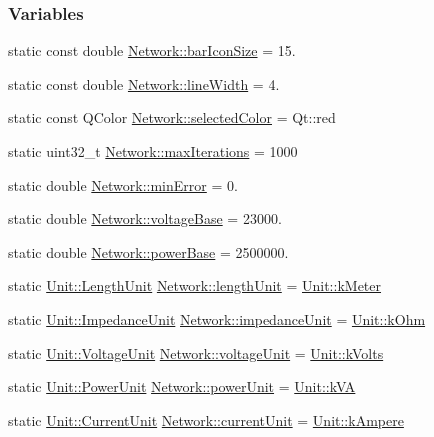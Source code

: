 \subsubsection*{Variables}
\begin{DoxyCompactItemize}
\item 
static const double \hyperlink{group___graphics_gaa334bbc93b3fde219840e95e23198b53}{Network\+::bar\+Icon\+Size} = 15.
\item 
static const double \hyperlink{group___graphics_ga3f810634c9908d62d33a1ab09a76c147}{Network\+::line\+Width} = 4.
\item 
static const Q\+Color \hyperlink{group___graphics_gaa9e21b8e2a24b0495e776a51e1aeed94}{Network\+::selected\+Color} = Qt\+::red
\item 
static uint32\+\_\+t \hyperlink{group___graphics_ga318dee060bc577eacd67d332efbbe1b2}{Network\+::max\+Iterations} = 1000
\item 
static double \hyperlink{group___graphics_gabcdc973129d3dda7572b7a1c388da1b5}{Network\+::min\+Error} = 0.
\item 
static double \hyperlink{group___graphics_ga7c1e79d9ac69df9a69f24eaf092fd5e5}{Network\+::voltage\+Base} = 23000.
\item 
static double \hyperlink{group___graphics_ga74bb7aa495d422f1f092acdf958df989}{Network\+::power\+Base} = 2500000.
\item 
static \hyperlink{class_unit_a8c8921f7b225ad6063b1cb573425b9a0}{Unit\+::\+Length\+Unit} \hyperlink{group___graphics_gae46c0e2bf39b343875e3c69066fe2652}{Network\+::length\+Unit} = \hyperlink{class_unit_a8c8921f7b225ad6063b1cb573425b9a0abfa41ebe7ee649a1f02c9b8ae570434b}{Unit\+::k\+Meter}
\item 
static \hyperlink{class_unit_a3747e779c805df24a71961290be3fbdf}{Unit\+::\+Impedance\+Unit} \hyperlink{group___graphics_ga5f3d72699a723c64a89d22e34df708ff}{Network\+::impedance\+Unit} = \hyperlink{class_unit_a3747e779c805df24a71961290be3fbdfa6b9c74d1763eefbaf751eeecff0bd9da}{Unit\+::k\+Ohm}
\item 
static \hyperlink{class_unit_a55b07dfa9457e1eca2c7194fe0cfc3c1}{Unit\+::\+Voltage\+Unit} \hyperlink{group___graphics_gacde031ef95f5c05565ee35769f2ed89e}{Network\+::voltage\+Unit} = \hyperlink{class_unit_a55b07dfa9457e1eca2c7194fe0cfc3c1aa54b2473993a702a3923525765bd6e4c}{Unit\+::k\+Volts}
\item 
static \hyperlink{class_unit_ace265ae255370ccacfd5370337572c3b}{Unit\+::\+Power\+Unit} \hyperlink{group___graphics_ga9504015bc566f4a3d3b4d4a86000293b}{Network\+::power\+Unit} = \hyperlink{class_unit_ace265ae255370ccacfd5370337572c3ba72b181a842ae2759488a2fa1410d3696}{Unit\+::k\+V\+A}
\item 
static \hyperlink{class_unit_a0794cf6c9682f48296dd4a5315389787}{Unit\+::\+Current\+Unit} \hyperlink{group___graphics_gac6a26db5fef2b1dd2a00faf6340d1702}{Network\+::current\+Unit} = \hyperlink{class_unit_a0794cf6c9682f48296dd4a5315389787a368a3c470f0b590a6100dda717a7dd4f}{Unit\+::k\+Ampere}
\end{DoxyCompactItemize}


